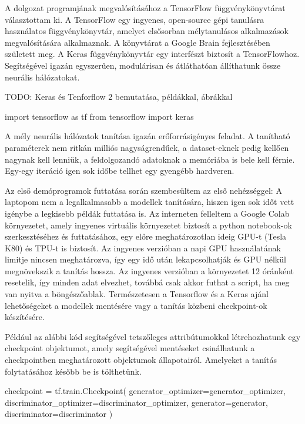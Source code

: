 
A dolgozat programjának megvalósításához a TensorFlow függvénykönyvtárat választottam ki. A TensorFlow egy ingyenes, open-source gépi tanulásra használatos függvénykönyvtár, amelyet elsősorban mélytanulásos alkalmazások megvalósítására alkalmaznak. A könyvtárat a Google Brain fejlesztésében született meg.
A Keras függvénykönyvtár egy interfészt biztosít a TensorFlowhoz. Segítségével igazán egyszerűen, modulárisan és átláthatóan állíthatunk össze neurális hálózatokat.

TODO: Keras és Tenforflow 2 bemutatása, példákkal, ábrákkal

\begin{python}
import tensorflow as tf
from tensorflow import keras
\end{python}


A mély neurális hálózatok tanítása igazán erőforrásigényes feladat. A tanítható paraméterek nem ritkán milliós nagyságrendűek, a dataset-eknek pedig kellően nagynak kell lenniük, a feldolgozandó adatoknak a memóriába is bele kell férnie. Egy-egy iteráció igen sok időbe tellhet egy gyengébb hardveren.

Az első demóprogramok futtatása során szembesültem az első nehézséggel: A laptopom nem a legalkalmasabb a modellek tanítására, hiszen igen sok időt vett igénybe a legkisebb példák futtatása is. Az interneten felleltem a Google Colab környezetet, amely ingyenes virtuális környezetet biztosít a python notebook-ok szerkesztéséhez és futtatásához, egy előre meghatározotlan ideig GPU-t (Tesla K80) és TPU-t is biztosít. Az ingyenes verzióban a napi GPU használatának limitje nincsen meghatározva, így egy idő után lekapcsolhatják és GPU nélkül megnövekszik a tanítás hossza. Az ingyenes verzióban a környezetet 12 óránként resetelik, így minden adat elvezhet, továbbá csak akkor futhat a script, ha meg van nyitva a böngészőablak. Természetesen a Tensorflow és a Keras ajánl lehetőségeket a modellek mentésére vagy a tanítás közbeni checkpoint-ok készítésére.

Például az alábbi kód segítségével tetszőleges attribútumokkal létrehozhatunk egy checkpoint objektumot, amely segítségével mentéseket csinálhatunk a checkpointben meghatározott objektumok állapotairól. Amelyeket a tanítás folytatásához később be is tölthetünk.
\begin{python}
checkpoint = tf.train.Checkpoint(
    generator_optimizer=generator_optimizer,
    discriminator_optimizer=discriminator_optimizer,
    generator=generator,
    discriminator=discriminator
)
\end{python}

